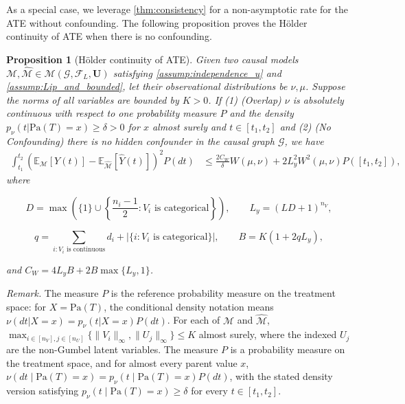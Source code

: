 \documentclass[12pt]{article}
\theoremstyle{plain}
\newtheorem{proposition}[theorem]{Proposition}
\theoremstyle{definition}
\theoremstyle{remark}
\begin{document}

As a special case, we leverage \cref{thm:consistency} for a non-asymptotic rate for the ATE without confounding. The following proposition proves the Hölder continuity of ATE when there is no confounding. 
\begin{proposition}[Hölder continuity of ATE]\label{prop:Lip_ATE}
    Given two causal models $ \mathcal{M} ,\hat{\mathcal{M}} \in\mathcal{M}(\mathcal{G},\mathcal{F}_L,\boldsymbol{U})$ satisfying \cref{assump:independence_u} and \cref{assump:Lip_and_bounded}, let their observational distributions be $ \nu ,\mu $. Suppose the norms of all variables are bounded by $K>0$. If (1) (Overlap) $\nu$ is absolutely continuous with respect to one probability measure $P$ and the density $p_{\nu}\left(t|\text{Pa}(T)=x\right)\geqslant\delta>0$ for $x$ almost surely and $t\in[t_1,t_2]$ and (2) (No Confounding) there is no hidden confounder in the causal graph $\mathcal{G}$, we have
\begin{equation*}
\begin{aligned}
\int_{t_1}^{t_2}(\mathbb{E}_{\mathcal{M}}[Y(t)]-\mathbb{E}_{\hat{\mathcal{M}}}[\hat{Y}(t)])^2 P(dt)
&\leqslant\frac{2C_W}{\delta}W(\mu,\nu)+2L_y^2W^2(\mu,\nu)P([t_1,t_2]),
\end{aligned}
\end{equation*}
where

\[
D=\max\left(\{1\}\cup\left\{\frac{n_i-1}{2}:V_i\text{ is categorical}\right\}\right),\qquad L_y=(LD+1)^{n_V},
\]

\[
q=\sum_{i:V_i\text{ is continuous}}d_i+\left|\{i:V_i\text{ is categorical}\}\right|,\qquad B=K(1+2qL_y),
\]

and $C_W=4L_yB+2B\max\{L_y,1\}$.
\end{proposition}

\noindent\textit{Remark.} The measure $P$ is the reference probability measure on the treatment space: for $X=\text{Pa}(T)$, the conditional density notation means $\nu(dt|X=x)=p_\nu(t|X=x)P(dt)$. For each of $\mathcal{M}$ and $\hat{\mathcal{M}}$, $\max_{i\in[n_V],j\in[n_U]}\{\|V_i\|_\infty,\|U_j\|_\infty\}\leqslant K$ almost surely, where the indexed $U_j$ are the non-Gumbel latent variables. The measure $P$ is a probability measure on the treatment space, and for almost every parent value $x$, $\nu(dt\mid\text{Pa}(T)=x)=p_\nu(t\mid\text{Pa}(T)=x)P(dt)$, with the stated density version satisfying $p_\nu(t\mid\text{Pa}(T)=x)\geqslant\delta$ for every $t\in[t_1,t_2]$.
\end{document}
